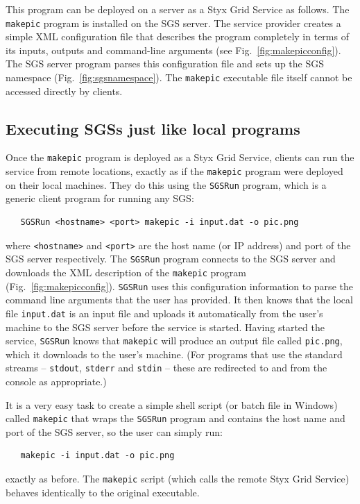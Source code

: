 \documentclass[a4paper]{article}
\begin{document}
This program can be deployed on a server as a Styx Grid Service as follows.  The \texttt{makepic} program is installed on the SGS server.  The service provider creates a simple XML configuration file that describes the program completely in terms of its inputs, outputs and command-line arguments (see Fig.~\ref{fig:makepicconfig}).  The SGS server program parses this configuration file and sets up the SGS namespace (Fig.~\ref{fig:sgsnamespace}).  The \texttt{makepic} executable file itself cannot be accessed directly by clients.

\subsection{Executing SGSs just like local programs}

Once the \texttt{makepic} program is deployed as a Styx Grid Service, clients can run the service from remote locations, exactly as if the \texttt{makepic} program were deployed on their local machines.  They do this using the \texttt{SGSRun} program, which is a generic client program for running any SGS:

\begin{verbatim}
   SGSRun <hostname> <port> makepic -i input.dat -o pic.png
\end{verbatim}
where \texttt{<hostname>} and \texttt{<port>} are the host name (or IP address) and port of the SGS server respectively.  The \texttt{SGSRun} program connects to the SGS server and downloads the XML description of the \texttt{makepic} program  (Fig.~\ref{fig:makepicconfig}).  \texttt{SGSRun} uses this configuration information to parse the command line arguments that the user has provided.  It then knows that the local file \texttt{input.dat} is an input file and uploads it automatically from the user's machine to the SGS server before the service is started.  Having started the service, \texttt{SGSRun} knows that \texttt{makepic} will produce an output file called \texttt{pic.png}, which it downloads to the user's machine.  (For programs that use the standard streams -- \texttt{stdout}, \texttt{stderr} and \texttt{stdin} -- these are redirected to and from the console as appropriate.)

It is a very easy task to create a simple shell script (or batch file in Windows) called \texttt{makepic} that wraps the \texttt{SGSRun} program and contains the host name and port of the SGS server, so the user can simply run:

\begin{verbatim}
   makepic -i input.dat -o pic.png
\end{verbatim}
exactly as before.  The \texttt{makepic} script (which calls the remote Styx Grid Service) behaves identically to the original executable.
\end{document}
